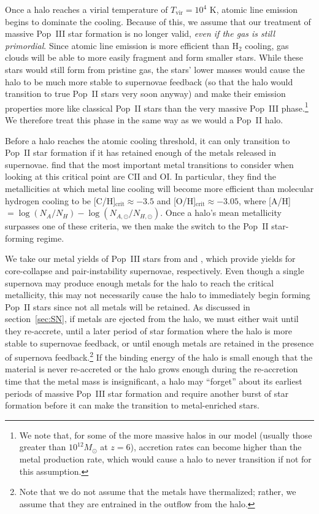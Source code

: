\documentclass[a4paper,fleqn,usenatbib]{mnras}
\begin{document}
Once a halo reaches a virial temperature of $T_\text{vir} = 10^{4}$ K, 
atomic line emission begins to dominate the cooling. Because of this, we assume that our treatment of massive Pop~III star formation is no longer valid,
\emph{even if the gas is still primordial}. Since 
atomic line emission is more efficient than H$_2$ cooling, gas clouds will be able to more easily fragment and form smaller stars. While these stars would still form from pristine gas, 
the stars' lower masses would cause the halo to be much more stable to supernovae feedback 
(so that the halo would transition to true Pop~II stars very soon anyway) and make their emission properties more like classical Pop~II stars than the very massive Pop~III phase.\footnote{We note that, for some of the more massive halos in our model (usually those greater than $10^{12} M_\odot$ at $z=6$), accretion rates can become higher than the metal production rate, which would cause a halo to never transition if not for this assumption. } 
We therefore treat this phase in the same way as we would a Pop~II halo.

Before a halo reaches the atomic cooling threshold, it can only transition to Pop~II star formation if it has retained enough of the metals released in supernovae. \citet{bromm_loeb_2003} find that the most important metal 
transitions to consider when looking at this 
critical point are CII and OI.  In particular, they find the 
metallicities at which metal line cooling will become more efficient than molecular hydrogen cooling to be [C/H]$_\text{crit} \approx -3.5$ and [O/H]$_\text{crit} \approx -3.05$, where [A/H] $= \log{(N_A / N_H)} - \log{(N_{A, \odot} / N_{H, \odot})}$.  Once a halo's mean metallicity surpasses one of these criteria, we then make the switch to the Pop~II star-forming regime.

We take our metal yields of Pop~III stars from \citet{heger_2010} and \citet{heger_2002}, which provide yields for core-collapse and pair-instability supernovae, respectively. Even though a single supernova may produce enough metals for the halo to reach the critical metallicity, this may not necessarily cause the halo to immediately begin forming Pop~II stars since not all metals will be retained. 
As discussed in section~\ref{sec:SN}, if metals are ejected from the halo, we must either wait until they re-accrete, until a later period of star formation where the halo is more stable to supernovae feedback, or until enough metals 
are retained in the presence of supernova feedback.\footnote{Note that we do not assume that the metals have thermalized; rather, we assume that they are entrained in the outflow from the halo.}
If the binding energy of the halo is small enough that the material is never re-accreted or the halo grows enough during the re-accretion time that the metal mass is insignificant, a halo may ``forget'' about its earliest periods of massive Pop~III star formation and require another burst of star formation before it can make the transition to metal-enriched stars.
\end{document}
